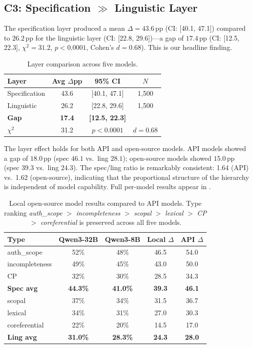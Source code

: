 \documentclass[11pt]{article}
\newcommand{\pp}{\,\text{pp}}
\begin{document}
\subsection{C3: Specification $\gg$ Linguistic Layer}
\label{sec:c3}

The specification layer produced a mean $\Delta=43.6\pp$ (CI: [40.1, 47.1]) compared to $26.2\pp$ for the linguistic layer (CI: [22.8, 29.6])---a gap of $17.4\pp$ (CI: [12.5, 22.3], $\chi^2=31.2$, $p<0.0001$, Cohen's $d=0.68$). This is our headline finding.

\begin{table}[t]
\centering
\small
\caption{Layer comparison across five models.}
\label{tab:layer}
\begin{tabular}{lccc}
\toprule
\textbf{Layer} & \textbf{Avg $\Delta$pp} & \textbf{95\% CI} & \textbf{$N$} \\
\midrule
Specification & 43.6 & [40.1, 47.1] & 1{,}500 \\
Linguistic & 26.2 & [22.8, 29.6] & 1{,}500 \\
\midrule
\textbf{Gap} & \textbf{17.4} & \textbf{[12.5, 22.3]} & \\
$\chi^2$ & 31.2 & $p<0.0001$ & $d=0.68$ \\
\bottomrule
\end{tabular}
\end{table}

The layer effect holds for both API and open-source models. API models showed a gap of $18.0\pp$ (spec $46.1$ vs.\ ling $28.1$); open-source models showed $15.0\pp$ (spec $39.3$ vs.\ ling $24.3$). The spec/ling ratio is remarkably consistent: 1.64 (API) vs.\ 1.62 (open-source), indicating that the proportional structure of the hierarchy is independent of model capability. Full per-model results appear in .

\begin{table}[t]
\centering
\small
\caption{Local open-source model results compared to API models. Type ranking \textit{auth\_scope} $>$ \textit{incompleteness} $>$ \textit{scopal} $>$ \textit{lexical} $>$ \textit{CP} $>$ \textit{coreferential} is preserved across all five models.}
\label{tab:local_results}
\begin{tabular}{lcccc}
\toprule
\textbf{Type} & \textbf{Qwen3-32B} & \textbf{Qwen3-8B} & \textbf{Local $\Delta$} & \textbf{API $\Delta$} \\
\midrule
auth\_scope & 52\% & 48\% & 46.5 & 54.0 \\
incompleteness & 49\% & 45\% & 43.0 & 50.0 \\
CP & 32\% & 30\% & 28.5 & 34.3 \\
\textbf{Spec avg} & \textbf{44.3\%} & \textbf{41.0\%} & \textbf{39.3} & \textbf{46.1} \\
\midrule
scopal & 37\% & 34\% & 31.5 & 36.7 \\
lexical & 34\% & 31\% & 27.0 & 30.3 \\
coreferential & 22\% & 20\% & 14.5 & 17.0 \\
\textbf{Ling avg} & \textbf{31.0\%} & \textbf{28.3\%} & \textbf{24.3} & \textbf{28.0} \\
\bottomrule
\end{tabular}
\end{table}
\end{document}
